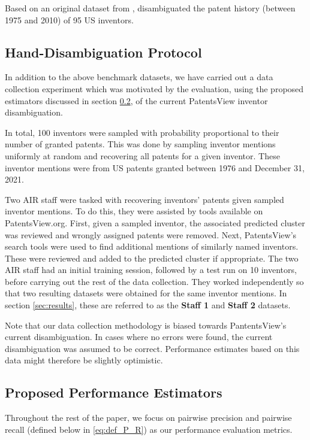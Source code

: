 \documentclass[fontsize=11pt]{article}
\theoremstyle{definition}
\begin{document}
Based on an original dataset from \cite{gu2008march}, \cite{Li2014} disambiguated the patent history (between 1975 and 2010) of 95 US inventors.



\subsection{Hand-Disambiguation Protocol}\label{sec:hand-disambiguation}

In addition to the above benchmark datasets, we have carried out a data collection experiment which was motivated by the evaluation, using the proposed estimators discussed in section \ref{sec:proposed_estimators}, of the current PatentsView inventor disambiguation.

In total, 100 inventors were sampled with probability proportional to their number of granted patents. This was done by sampling inventor mentions uniformly at random and recovering all patents for a given inventor. These inventor mentions were from US patents granted between 1976 and December 31, 2021.

Two AIR staff were tasked with recovering inventors' patents given sampled inventor mentions. To do this, they were assisted by tools available on PatentsView.org. First, given a sampled inventor, the associated predicted cluster was reviewed and wrongly assigned patents were removed. Next, PatentsView's search tools were used to find additional mentions of similarly named inventors. These were reviewed and added to the predicted cluster if appropriate. The two AIR staff had an initial training session, followed by a test run on 10 inventors, before carrying out the rest of the data collection. They worked independently so that two resulting datasets were obtained for the same inventor mentions. In section \ref{sec:results}, these are referred to as the \textbf{Staff 1} and \textbf{Staff 2} datasets.

Note that our data collection methodology is biased towards PantentsView's current disambiguation. In cases where no errors were found, the current disambiguation was assumed to be correct. Performance estimates based on this data might therefore be slightly optimistic.

\subsection{Proposed Performance Estimators}\label{sec:proposed_estimators}

Throughout the rest of the paper, we focus on pairwise precision and pairwise recall (defined below in \eqref{eq:def_P_R}) as our performance evaluation metrics. 
\end{document}
